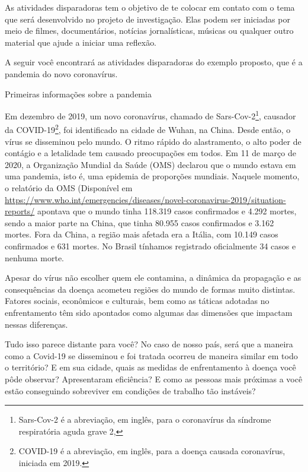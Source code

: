 \label{etapa1}

As atividades disparadoras tem o objetivo de te colocar em contato com o tema que será desenvolvido no projeto de investigação. Elas podem ser iniciadas por meio de filmes, documentários, notícias jornalísticas, músicas ou qualquer outro material que ajude a iniciar uma reflexão.

A seguir você encontrará as atividades disparadoras do exemplo proposto, que é a pandemia do novo coronavírus. 

\begin{example}{Primeiras informações sobre a pandemia}
\label{primeiras-informacoes}

Em dezembro de 2019, um novo coronavírus, chamado de Sars-Cov-2\footnote{Sars-Cov-2 é a abreviação, em inglês, para o coronavírus da síndrome respiratória aguda grave 2,}, causador da COVID-19\footnote{COVID-19 é a abreviação, em inglês, para a doença causada coronavírus, iniciada em  2019.}, foi identificado na cidade de Wuhan, na China. Desde então, o vírus se disseminou pelo mundo. O ritmo rápido do alastramento, o alto poder de contágio e a letalidade tem causado preocupações em todos. Em 11 de março de 2020, a Organização Mundial da Saúde (OMS) declarou que o mundo estava em uma pandemia, isto é, uma epidemia de proporções mundiais. Naquele momento, o relatório da OMS (Disponível em \url{https://www.who.int/emergencies/diseases/novel-coronavirus-2019/situation-reports/} apontava que o mundo tinha 118.319 casos confirmados e 4.292 mortes, sendo a maior parte na China, que tinha 80.955 casos confirmados e 3.162 mortes. Fora da China, a região mais afetada era a Itália, com 10.149 casos confirmados e 631 mortes. No Brasil tínhamos registrado oficialmente 34 casos e nenhuma morte.

Apesar do vírus não escolher quem ele contamina, a dinâmica da propagação e as consequências da doença acometeu regiões do mundo de formas muito distintas. Fatores sociais, econômicos e culturais, bem como as táticas adotadas no enfrentamento têm sido apontados como algumas das dimensões que impactam nessas diferenças. 

Tudo isso parece distante para você? No caso de nosso país, será que a maneira como a Covid-19 se disseminou e foi tratada ocorreu de maneira similar em todo o território? E em sua cidade, quais as medidas de enfrentamento à doença você pôde observar? Apresentaram eficiência? E como as pessoas mais próximas a você estão conseguindo sobreviver em condições de trabalho tão instáveis?


\end{example}
